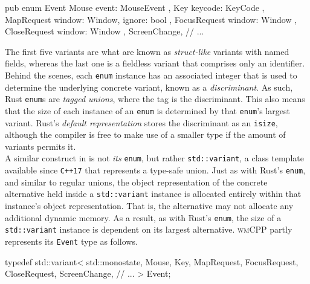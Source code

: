 \begin{rustblock}
  pub enum Event {
    Mouse { event: MouseEvent },
    Key { keycode: KeyCode },
    MapRequest { window: Window, ignore: bool },
    FocusRequest { window: Window },
    CloseRequest { window: Window },
    ScreenChange,
    // ...
  }
\end{rustblock}

The   first  five   variants  are   what  are   known  as   \textit{struct-like}
variants   with  named   fields,   whereas   the  last   one   is  a   fieldless
variant  that   comprises  only  an   identifier\cite{therustreference}.  Behind
the   scenes,   each   \texttt{enum}  instance   has   an   associated
integer   that  is   used  to   determine  the   underlying  concrete   variant,
known   as  a   \textit{discriminant}\cite{therustreference}.   As  such,   Rust
\texttt{enum}s  are  \textit{tagged  unions},  where the  tag  is  the
discriminant.  This   also  means  that  the   size  of  each  instance   of  an
\texttt{enum} is determined  by that \texttt{enum}'s largest
variant. Rust's  \textit{default representation}  stores the discriminant  as an
\texttt{isize}, although the compiler is free to make use of a smaller
type if the amount of variants permits it\cite{therustreference}.\\


A  similar  construct  in   \cpp  is  not  \textit{its}  \texttt{enum},
but   rather   \texttt{std::variant},   a  class   template   available
since  \texttt{C++17}  that  represents  a  type-safe  union\cite{cppstd}.  Just
as  with   Rust's  \texttt{enum},  and  similar   to  regular  unions,
the  object   representation  of   the  concrete   alternative  held   inside  a
\texttt{std::variant}  instance  is   allocated  entirely  within  that
instance's object representation\cite{cppstd}. That  is, the alternative may not
allocate any additional dynamic memory\cite{cppstd}. As a result, as with Rust's
\texttt{enum}, the  size of a  \texttt{std::variant} instance
is  dependent on  its  largest  alternative\cite{cppstd}. \textsc{wmCPP}  partly
represents its \texttt{Event} type as follows.

\begin{cppblock}
  typedef std::variant<
    std::monostate,
    Mouse,
    Key,
    MapRequest,
    FocusRequest,
    CloseRequest,
    ScreenChange,
    // ...
  > Event;
\end{cppblock}

